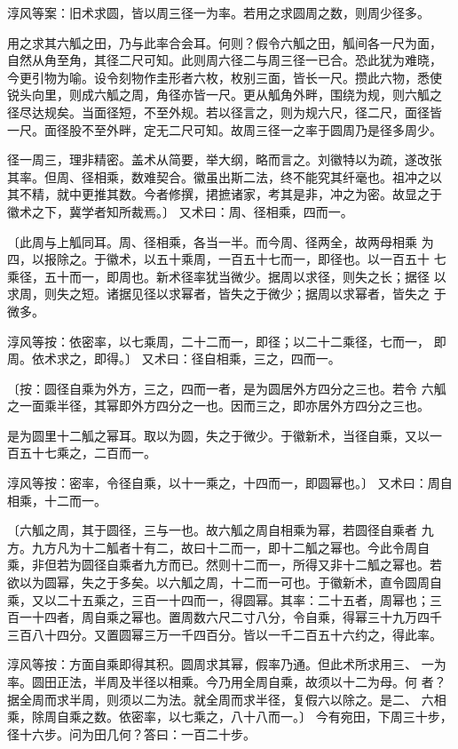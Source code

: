 \documentclass[a4paper,12pt,UTF8,twoside]{ctexbook}
\begin{document}
淳风等案：旧术求圆，皆以周三径一为率。若用之求圆周之数，则周少径多。

用之求其六觚之田，乃与此率合会耳。何则？假令六觚之田，觚间各一尺为面， 自然从角至角，其径二尺可知。此则周六径二与周三径一已合。恐此犹为难晓， 今更引物为喻。设令刻物作圭形者六枚，枚别三面，皆长一尺。攒此六物，悉使 锐头向里，则成六觚之周，角径亦皆一尺。更从觚角外畔，围绕为规，则六觚之 径尽达规矣。当面径短，不至外规。若以径言之，则为规六尺，径二尺，面径皆 一尺。面径股不至外畔，定无二尺可知。故周三径一之率于圆周乃是径多周少。

径一周三，理非精密。盖术从简要，举大纲，略而言之。刘徽特以为疏，遂改张 其率。但周、径相乘，数难契合。徽虽出斯二法，终不能究其纤毫也。祖冲之以 其不精，就中更推其数。今者修撰，捃摭诸家，考其是非，冲之为密。故显之于 徽术之下，冀学者知所裁焉。〕 又术曰：周、径相乘，四而一。

〔此周与上觚同耳。周、径相乘，各当一半。而今周、径两全，故两母相乘 为四，以报除之。于徽术，以五十乘周，一百五十七而一，即径也。以一百五十 七乘径，五十而一，即周也。新术径率犹当微少。据周以求径，则失之长；据径 以求周，则失之短。诸据见径以求幂者，皆失之于微少；据周以求幂者，皆失之 于微多。

淳风等按：依密率，以七乘周，二十二而一，即径；以二十二乘径，七而一， 即周。依术求之，即得。〕 又术曰：径自相乘，三之，四而一。

〔按：圆径自乘为外方，三之，四而一者，是为圆居外方四分之三也。若令 六觚之一面乘半径，其幂即外方四分之一也。因而三之，即亦居外方四分之三也。

是为圆里十二觚之幂耳。取以为圆，失之于微少。于徽新术，当径自乘，又以一 百五十七乘之，二百而一。

淳风等按：密率，令径自乘，以十一乘之，十四而一，即圆幂也。〕 又术曰：周自相乘，十二而一。

〔六觚之周，其于圆径，三与一也。故六觚之周自相乘为幂，若圆径自乘者 九方。九方凡为十二觚者十有二，故曰十二而一，即十二觚之幂也。今此令周自 乘，非但若为圆径自乘者九方而已。然则十二而一，所得又非十二觚之幂也。若 欲以为圆幂，失之于多矣。以六觚之周，十二而一可也。于徽新术，直令圆周自 乘，又以二十五乘之，三百一十四而一，得圆幂。其率：二十五者，周幂也；三 百一十四者，周自乘之幂也。置周数六尺二寸八分，令自乘，得幂三十九万四千 三百八十四分。又置圆幂三万一千四百分。皆以一千二百五十六约之，得此率。

淳风等按：方面自乘即得其积。圆周求其幂，假率乃通。但此术所求用三、 一为率。圆田正法，半周及半径以相乘。今乃用全周自乘，故须以十二为母。何 者？据全周而求半周，则须以二为法。就全周而求半径，复假六以除之。是二、 六相乘，除周自乘之数。依密率，以七乘之，八十八而一。〕 今有宛田，下周三十步，径十六步。问为田几何？答曰：一百二十步。
\end{document}
